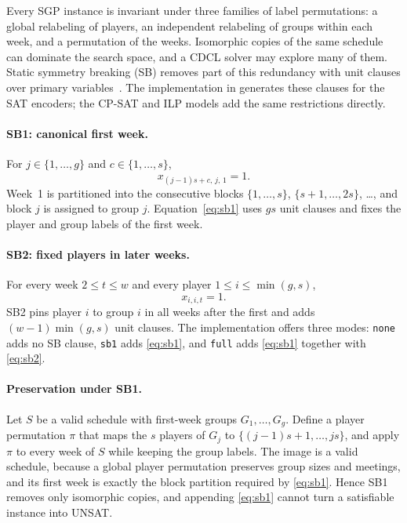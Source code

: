 \documentclass[a4paper,fleqn]{cas-sc}
\begin{document}
Every SGP instance is invariant under three families of label
permutations: a global relabeling of players, an independent relabeling
of groups within each week, and a permutation of the weeks. Isomorphic
copies of the same schedule can dominate the search space, and a CDCL
solver may explore many of them. Static symmetry breaking (SB) removes
part of this redundancy with unit clauses over primary
variables~\cite{kieu2025nse,walsh2006symmetry}. The implementation in
 generates these clauses for the SAT encoders; the
CP-SAT and ILP models add the same restrictions directly.

\paragraph{SB1: canonical first week.}
For $j\in\{1,\ldots,g\}$ and $c\in\{1,\ldots,s\}$,
\begin{equation}
 x_{(j-1)s+c,\,j,\,1}=1.
 \label{eq:sb1}
\end{equation}
Week~1 is partitioned into the consecutive blocks
$\{1,\ldots,s\}$, $\{s+1,\ldots,2s\}$, \ldots, and block $j$ is assigned
to group $j$. Equation~\eqref{eq:sb1} uses $gs$ unit clauses and fixes
the player and group labels of the first week.

\paragraph{SB2: fixed players in later weeks.}
For every week $2\le t\le w$ and every player $1\le i\le\min(g,s)$,
\begin{equation}
 x_{i,i,t}=1.
 \label{eq:sb2}
\end{equation}
SB2 pins player $i$ to group $i$ in all weeks after the first and adds
$(w-1)\min(g,s)$ unit clauses. The implementation offers three modes:
\texttt{none} adds no SB clause, \texttt{sb1} adds \eqref{eq:sb1}, and
\texttt{full} adds \eqref{eq:sb1} together with \eqref{eq:sb2}.

\paragraph{Preservation under SB1.}
Let $S$ be a valid schedule with first-week groups $G_1,\ldots,G_g$.
Define a player permutation $\pi$ that maps the $s$ players of $G_j$ to
$\{(j-1)s+1,\ldots,js\}$, and apply $\pi$ to every week of $S$ while
keeping the group labels. The image is a valid schedule, because a
global player permutation preserves group sizes and meetings, and its
first week is exactly the block partition required by \eqref{eq:sb1}.
Hence SB1 removes only isomorphic copies, and appending \eqref{eq:sb1}
cannot turn a satisfiable instance into UNSAT.
\end{document}
